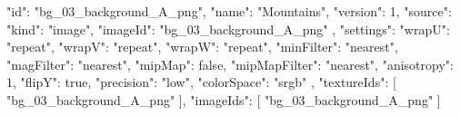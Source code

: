 {
  "id": "bg_03_background_A_png",
  "name": "Mountains",
  "version": 1,
  "source": {
    "kind": "image",
    "imageId": "bg_03_background_A_png"
  },
  "settings": {
    "wrapU": "repeat",
    "wrapV": "repeat",
    "wrapW": "repeat",
    "minFilter": "nearest",
    "magFilter": "nearest",
    "mipMap": false,
    "mipMapFilter": "nearest",
    "anisotropy": 1,
    "flipY": true,
    "precision": "low",
    "colorSpace": "srgb"
  },
  "textureIds": [
    "bg_03_background_A_png"
  ],
  "imageIds": [
    "bg_03_background_A_png"
  ]
}
